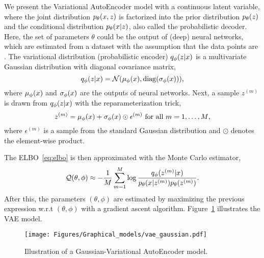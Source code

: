 \begin{example}
    \label{ex:gaussian_case}
    We present the Variational AutoEncoder model with a continuous latent variable, where 
    the joint distribution $p_{\theta}(x, z)$ is factorized into 
    the prior distribution $p_{\theta}(z)$ and the conditional distribution 
    $p_{\theta}(x|z)$, also called the probabilistic decoder.
    Here, the set of parameters $\theta$ could be the output of (deep)
    neural networks, which are estimated from a dataset 
    with the assumption that the data points are \iid. 
    The variational distribution (probabilistic encoder)
    $q_\phi(z|x)$ is a multivariate Gaussian distribution with diagonal 
    covariance matrix,
    \begin{equation*}
        q_\phi(z|x) = \mathcal{N}(\mu_{\phi}(x), \mathrm{diag}(\sigma_{\phi}(x))) \text{,}
    \end{equation*}
    where
    $\mu_{\phi}(x)$ and $\sigma_{\phi}(x)$ are the outputs of neural networks. 
    Next, a sample $z^{(m)}$ is drawn from $q_\phi(z|x)$ with the 
    reparameterization trick,
    \begin{equation*}
        z^{(m)} = \mu_{\phi}(x) + 
        \sigma_{\phi}(x) \odot \epsilon^{(m)} \text{ for all } m = 1, \dots, M \text{,}
    \end{equation*}
    where $\epsilon^{(m)}$ is a sample from the standard Gaussian distribution
    and $\odot$ denotes the element-wise product.

    The ELBO~\eqref{eq:elbo} is then approximated with the 
    Monte Carlo estimator,
    \begin{equation*}
        \label{eq:elbo_vae_mc}
        \mathcal{Q}(\theta, \phi) \approx - \frac{1}{M} \sum_{m=1}^M \log 
        \frac{q_\phi(z^{(m)}|x)}
        { p_{\theta}(x|z^{(m)}) p_{\theta}(z^{(m)}) }\text{.}
    \end{equation*}
    After this, the parameters $(\theta, \phi)$ are estimated by maximizing the 
    previous expression
    w.r.t  $(\theta, \phi)$ with a gradient ascent algorithm.
    Figure~\ref{fig:rt_example_gaussian} 
    illustrates the VAE model.
    
    \begin{figure}[htb]
        \centering
        \texttt{[image: Figures/Graphical\_models/vae\_gaussian.pdf]}
        \caption{Illustration of a Gaussian-Variational AutoEncoder model.}
        \label{fig:rt_example_gaussian}
    \end{figure}
    
    \end{example}



